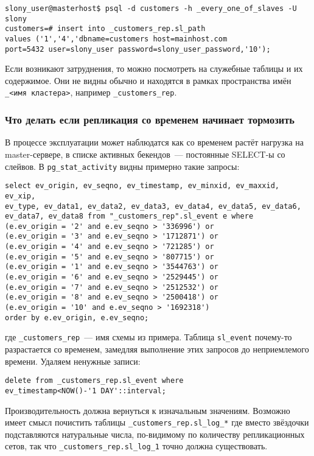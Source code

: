 \begin{lstlisting}[label=lst:slony18,caption=Устранение неисправностей]
slony_user@masterhost$ psql -d customers -h _every_one_of_slaves -U slony
customers=# insert into _customers_rep.sl_path
values ('1','4','dbname=customers host=mainhost.com
port=5432 user=slony_user password=slony_user_password,'10');
\end{lstlisting}

Если возникают затруднения, то можно посмотреть на служебные таблицы и их содержимое. Они не видны обычно и находятся в рамках пространства имён \lstinline!_<имя кластера>!, например \lstinline!_customers_rep!.

\subsubsection{Что делать если репликация со временем начинает тормозить}

В процессе эксплуатации может наблюдатся как со временем растёт нагрузка на master-сервере, в списке активных бекендов~--- постоянные SELECT-ы со слейвов. В \lstinline!pg_stat_activity! видны примерно такие запросы:

\begin{lstlisting}[label=lst:slony19,caption=Устранение неисправностей]
select ev_origin, ev_seqno, ev_timestamp, ev_minxid, ev_maxxid, ev_xip,
ev_type, ev_data1, ev_data2, ev_data3, ev_data4, ev_data5, ev_data6,
ev_data7, ev_data8 from "_customers_rep".sl_event e where
(e.ev_origin = '2' and e.ev_seqno > '336996') or
(e.ev_origin = '3' and e.ev_seqno > '1712871') or
(e.ev_origin = '4' and e.ev_seqno > '721285') or
(e.ev_origin = '5' and e.ev_seqno > '807715') or
(e.ev_origin = '1' and e.ev_seqno > '3544763') or
(e.ev_origin = '6' and e.ev_seqno > '2529445') or
(e.ev_origin = '7' and e.ev_seqno > '2512532') or
(e.ev_origin = '8' and e.ev_seqno > '2500418') or
(e.ev_origin = '10' and e.ev_seqno > '1692318')
order by e.ev_origin, e.ev_seqno;
\end{lstlisting}

где \lstinline!_customers_rep!~--- имя схемы из примера. Таблица \lstinline!sl_event! почему-то разрастается со временем, замедляя выполнение этих запросов до неприемлемого времени. Удаляем ненужные записи:

\begin{lstlisting}[label=lst:slony20,caption=Устранение неисправностей]
delete from _customers_rep.sl_event where
ev_timestamp<NOW()-'1 DAY'::interval;
\end{lstlisting}

Производительность должна вернуться к изначальным значениям. Возможно имеет смысл почистить таблицы \lstinline!_customers_rep.sl_log_*! где вместо звёздочки подставляются натуральные числа, по-видимому по количеству репликационных сетов, так что \lstinline!_customers_rep.sl_log_1! точно должна существовать.

